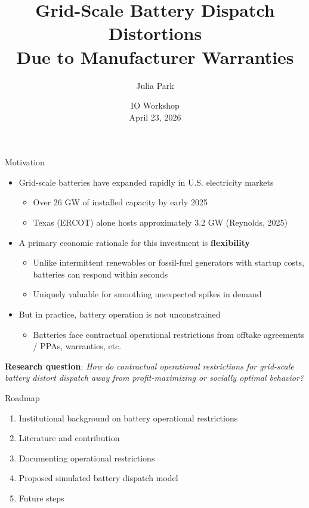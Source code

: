 \documentclass[aspectratio=169]{beamer}
\title{Grid-Scale Battery Dispatch Distortions \\ Due to Manufacturer Warranties}
\author{Julia Park}
\date{IO Workshop \\ April 23, 2026}
\begin{document}
\frame{\titlepage}

\begin{frame}{Motivation}
\begin{itemize}
    \item Grid-scale batteries have expanded rapidly in U.S. electricity markets
    \begin{itemize}
        \item Over 26 GW of installed capacity by early 2025
        \item Texas (ERCOT) alone hosts approximately 3.2 GW (Reynolds, 2025)
    \end{itemize}
    \pause
    \item A primary economic rationale for this investment is \textbf{flexibility}
    \begin{itemize}
        \item Unlike intermittent renewables or fossil-fuel generators with startup costs, batteries can respond within seconds
        \item Uniquely valuable for smoothing unexpected spikes in demand
    \end{itemize}
    \pause
    \item But in practice, battery operation is not unconstrained
    \begin{itemize}
        \item Batteries face contractual operational restrictions from offtake agreements / PPAs, warranties, etc.
    \end{itemize}
\end{itemize}

\textbf{Research question}: \textit{How do contractual operational restrictions for grid-scale battery distort dispatch away from profit-maximizing or socially optimal behavior?}
\end{frame}



\begin{frame}{Roadmap}
    \begin{enumerate}
        \item Institutional background on battery operational restrictions
        \item Literature and contribution
        \item Documenting operational restrictions
        \item Proposed simulated battery dispatch model 
        \item Future steps
    \end{enumerate}
\end{frame}
\end{document}
